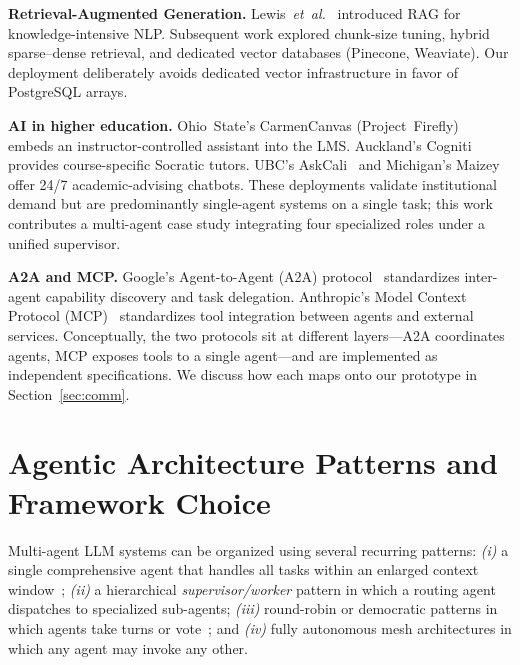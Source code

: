 \documentclass[conference]{IEEEtran}
\begin{document}
\textbf{Retrieval-Augmented Generation.} Lewis~\textit{et~al.}~\cite{lewis2020rag} introduced RAG for knowledge-intensive NLP. Subsequent work explored chunk-size tuning, hybrid sparse--dense retrieval, and dedicated vector databases (Pinecone, Weaviate). Our deployment deliberately avoids dedicated vector infrastructure in favor of PostgreSQL arrays.

\textbf{AI in higher education.} Ohio~State's CarmenCanvas (Project~Firefly)~\cite{osu_firefly_2026} embeds an instructor-controlled assistant into the LMS. Auckland's Cogniti~\cite{auckland_cogniti_2026} provides course-specific Socratic tutors. UBC's AskCali~\cite{ubc_askcali_2025} and Michigan's Maizey~\cite{umich_maizey_2025} offer 24/7 academic-advising chatbots. These deployments validate institutional demand but are predominantly single-agent systems on a single task; this work contributes a multi-agent case study integrating four specialized roles under a unified supervisor.

\textbf{A2A and MCP.} Google's Agent-to-Agent (A2A) protocol~\cite{google_a2a_2025} standardizes inter-agent capability discovery and task delegation. Anthropic's Model Context Protocol (MCP)~\cite{anthropic_mcp_2024} standardizes tool integration between agents and external services. Conceptually, the two protocols sit at different layers---A2A coordinates agents, MCP exposes tools to a single agent---and are implemented as independent specifications. We discuss how each maps onto our prototype in Section~\ref{sec:comm}.

\section{Agentic Architecture Patterns and Framework Choice}
\label{sec:patterns}

Multi-agent LLM systems can be organized using several recurring patterns: \emph{(i)} a single comprehensive agent that handles all tasks within an enlarged context window~\cite{wgu_labs_2025}; \emph{(ii)} a hierarchical \emph{supervisor/worker} pattern in which a routing agent dispatches to specialized sub-agents; \emph{(iii)} round-robin or democratic patterns in which agents take turns or vote~\cite{wu2023autogen}; and \emph{(iv)} fully autonomous mesh architectures in which any agent may invoke any other.
\end{document}
